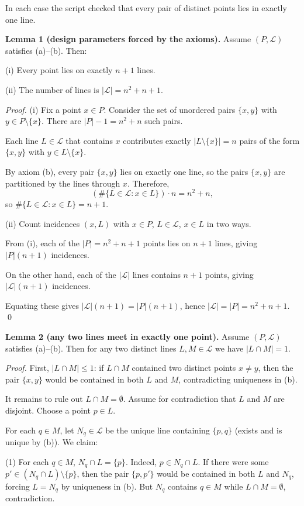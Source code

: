 In each case the script checked that every pair of distinct points lies in exactly one line.

\medskip

\textbf{Lemma 1 (design parameters forced by the axioms).}
Assume $(P,\mathcal L)$ satisfies (a)--(b). Then:

(i) Every point lies on exactly $n+1$ lines.

(ii) The number of lines is $|\mathcal L|=n^2+n+1$.

\emph{Proof.}
(i) Fix a point $x\in P$. Consider the set of unordered pairs $\{x,y\}$ with $y\in P\setminus\{x\}$. There are $|P|-1 = n^2+n$ such pairs.

Each line $L\in\mathcal L$ that contains $x$ contributes exactly $|L\setminus\{x\}|=n$ pairs of the form $\{x,y\}$ with $y\in L\setminus\{x\}$.

By axiom (b), every pair $\{x,y\}$ lies on exactly one line, so the pairs $\{x,y\}$ are partitioned by the lines through $x$. Therefore,
\[
(\#\{L\in\mathcal L: x\in L\})\cdot n = n^2+n,
\]
so $\#\{L\in\mathcal L: x\in L\}=n+1$.

(ii) Count incidences $(x,L)$ with $x\in P$, $L\in\mathcal L$, $x\in L$ in two ways.

From (i), each of the $|P|=n^2+n+1$ points lies on $n+1$ lines, giving $|P|(n+1)$ incidences.

On the other hand, each of the $|\mathcal L|$ lines contains $n+1$ points, giving $|\mathcal L|(n+1)$ incidences.

Equating these gives $|\mathcal L|(n+1)=|P|(n+1)$, hence $|\mathcal L|=|P|=n^2+n+1$.
\qed

\medskip

\textbf{Lemma 2 (any two lines meet in exactly one point).}
Assume $(P,\mathcal L)$ satisfies (a)--(b). Then for any two distinct lines $L,M\in\mathcal L$ we have $|L\cap M|=1$.

\emph{Proof.}
First, $|L\cap M|\le 1$: if $L\cap M$ contained two distinct points $x\ne y$, then the pair $\{x,y\}$ would be contained in both $L$ and $M$, contradicting uniqueness in (b).

It remains to rule out $L\cap M=\emptyset$.
Assume for contradiction that $L$ and $M$ are disjoint. Choose a point $p\in L$.

For each $q\in M$, let $N_q\in\mathcal L$ be the unique line containing $\{p,q\}$ (exists and is unique by (b)).
We claim:

(1) For each $q\in M$, $N_q\cap L = \{p\}$.
Indeed, $p\in N_q\cap L$. If there were some $p'\in (N_q\cap L)\setminus\{p\}$, then the pair $\{p,p'\}$ would be contained in both $L$ and $N_q$, forcing $L=N_q$ by uniqueness in (b). But $N_q$ contains $q\in M$ while $L\cap M=\emptyset$, contradiction.

